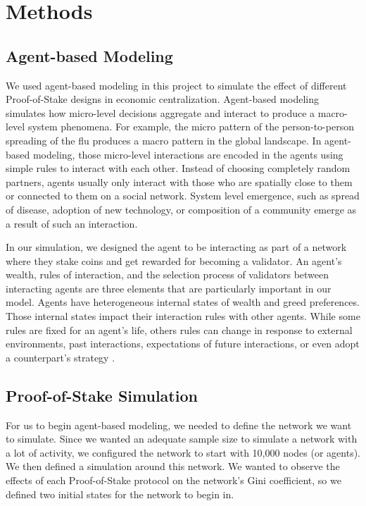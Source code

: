 
\chapter{Methods}

\section{Agent-based Modeling}
We used agent-based modeling in this project to simulate the effect of different Proof-of-Stake designs in economic centralization. Agent-based modeling simulates how micro-level decisions aggregate and interact to produce a macro-level system phenomena. For example, the micro pattern of the person-to-person spreading of the flu produces a macro pattern in the global landscape. In agent-based modeling, those micro-level interactions are encoded in the agents using simple rules to interact with each other. Instead of choosing completely random partners, agents usually only interact with those who are spatially close to them or connected to them on a social network. System level emergence, such as spread of disease, adoption of new technology, or composition of a community emerge as a result of such an interaction.

In our simulation, we designed the agent to be interacting as part of a network where they stake coins and get rewarded for becoming a validator. An agent's wealth, rules of interaction, and the selection process of validators between interacting agents are three elements that are particularly important in our model. Agents have heterogeneous internal states of wealth and greed preferences. Those internal states impact their interaction rules with other agents. While some rules are fixed for an agent's life, others rules can change in response to external environments, past interactions, expectations of future interactions, or even adopt a counterpart's strategy \cite{CRYPTO:9}. 

\section{Proof-of-Stake Simulation}
For us to begin agent-based modeling, we needed to define the network we want to simulate. Since we wanted an adequate sample size to simulate a network with a lot of activity, we configured the network to start with 10,000 nodes (or agents). We then defined a simulation around this network. We wanted to observe the effects of each Proof-of-Stake protocol on the network's Gini coefficient, so we defined two initial states for the network to begin in.

